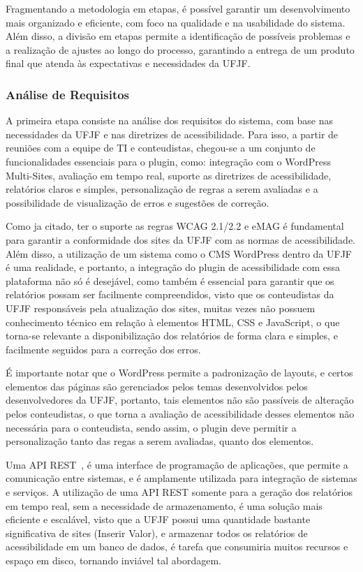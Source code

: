 \documentclass[12pt]{article}
\begin{document}
Fragmentando a metodologia em etapas, é possível garantir um desenvolvimento
mais organizado e eficiente, com foco na qualidade e na usabilidade do sistema.
Além disso, a divisão em etapas permite a identificação de possíveis problemas
e a realização de ajustes ao longo do processo, garantindo a entrega de um
produto final que atenda às expectativas e necessidades da UFJF\@.

\subsubsection{Análise de Requisitos}
A primeira etapa consiste na análise dos requisitos do sistema, com base nas
necessidades da UFJF e nas diretrizes de acessibilidade. Para isso, a partir
de reuniões com a equipe de TI e conteudistas, chegou-se a um conjunto de
funcionalidades essenciais para o plugin, como: integração com o WordPress
Multi-Sites, avaliação em tempo real, suporte as diretrizes de acessibilidade,
relatórios claros e simples, personalização de regras a serem avaliadas e a
possibilidade de visualização de erros e sugestões de correção.

Como ja citado, ter o suporte as regras WCAG 2.1/2.2 e eMAG é fundamental para
garantir a conformidade dos sites da UFJF com as normas de acessibilidade.
Além disso, a utilização de um sistema como o CMS WordPress dentro da UFJF
é uma realidade, e portanto, a integração do plugin de acessibilidade com
essa plataforma não só é desejável, como também é essencial para garantir
que os relatórios possam ser facilmente compreendidos, visto que os
conteudistas da UFJF responsáveis pela atualização dos sites, muitas
vezes não possuem conhecimento técnico em relação à elementos HTML,
CSS e JavaScript, o que torna-se relevante a disponibilização dos
relatórios de forma clara e simples, e facilmente seguidos para a
correção dos erros.

É importante notar que o WordPress permite a padronização de layouts,
e certos elementos das páginas são gerenciados pelos temas desenvolvidos pelos
desenvolvedores da UFJF, portanto, tais elementos não são passíveis de alteração
pelos conteudistas, o que torna a avaliação de acessibilidade desses elementos
não necessária para o conteudista, sendo assim, o plugin deve permitir a
personalização tanto das regas a serem avaliadas, quanto dos elementos.

Uma API REST~\autocite{api}, é uma interface de programação de aplicações, que
permite a comunicação entre sistemas, e é amplamente utilizada para integração
de sistemas e serviços. A utilização de uma API REST somente para a geração
dos relatórios em tempo real, sem a necessidade de armazenamento, é uma
solução mais eficiente e escalável, visto que a UFJF possui uma quantidade
bastante significativa de sites (Inserir Valor), e armazenar todos os
relatórios de acessibilidade em um banco de dados, é tarefa que consumiria
muitos recursos e espaço em disco, tornando inviável tal abordagem.
\end{document}
